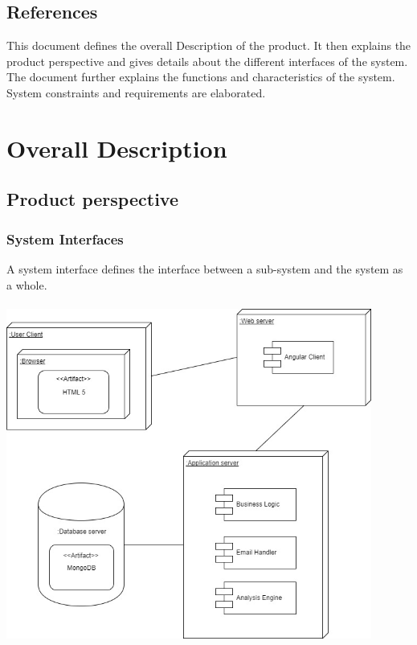 \documentclass[a4paper,12pt]{article}
\begin{document}
        \subsection{References}
        This document defines the overall Description of the product. It then explains the product perspective and gives details about the different interfaces of the system. The document further explains the functions and characteristics of the system. System constraints and requirements are elaborated.
        
    \pagebreak
    
    \section{Overall Description}
    
    	\subsection{Product perspective}
    	
        	\subsubsection{System Interfaces}
        	
        	A system interface defines the interface between a sub-system and the system as a whole.\\\\ 
        	
        	\includegraphics[width=0.9\textwidth]{../diagrams/system_overview.jpg}
        
\end{document}
